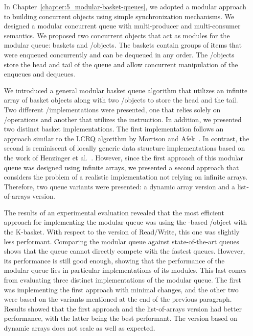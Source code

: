 In Chapter~\ref{chapter:5_modular-basket-queues}, we adopted a modular approach to building concurrent objects using simple synchronization mechanisms.
 We designed a modular concurrent queue with multi-producer and multi-consumer semantics. We proposed two concurrent objects that act as modules for the modular queue: baskets and \LL/\IC objects. The baskets contain groups of items that were enqueued concurrently and can be dequeued in any order. The \LL/\IC objects store the head and tail of the queue and allow concurrent manipulation of the enqueues and dequeues.

We introduced a general modular basket queue algorithm that utilizes an infinite array of basket objects along with two \LL/\IC objects to store the head and the tail. Two different \LL/\IC implementations were presented, one that relies solely on \R/\W operations and another that utilizes the \CAS instruction. In addition, we presented two distinct basket implementations. The first implementation follows an approach similar to the LCRQ algorithm by Morrison and Afek~\cite{ppopp2013x86queues}. In contrast, the second is reminiscent of locally generic data structure implementations based on the work of Henzinger et al.~\cite{DBLP_conf_concur_HaasHHKLPSSV16}. However, since the first approach of this modular queue was designed using infinite arrays, we presented a second approach that considers the problem of a realistic implementation not relying on infinite arrays. Therefore, two queue variants were presented: a dynamic array version and a list-of-arrays version.

The results of an experimental evaluation revealed that the most efficient approach for implementing the modular queue was using the \CAS-based \LL/\IC object with the K-basket. With respect to the version of Read/Write, this one was slightly less performant. Comparing the modular queue against state-of-the-art queues shows that the queue cannot directly compete with the fastest queues. However, its performance is still good enough, showing that the performance of the modular queue lies in particular implementations of its modules. This last comes from evaluating three distinct implementations of the modular queue. The first was implementing the first approach with minimal changes, and the other two were based on the variants mentioned at the end of the previous paragraph. Results showed that the first approach and the list-of-arrays version had better performance, with the latter being the best performant. The version based on dynamic arrays does not scale as well as expected.

